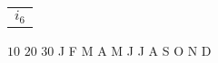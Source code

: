\documentclass{book}
\begin{document}
\stopmpxshipout
\mpxshipout%
{\small \renewcommand{\arraystretch}{.9}
              \circuitfont\begin{tabular}{@{}l@{}}
                  $i_6$ 
              \end{tabular}}%
\stopmpxshipout
\mpxshipout%
\small $10$%
\stopmpxshipout
\mpxshipout%
\small $20$%
\stopmpxshipout
\mpxshipout%
\small $30$%
\stopmpxshipout
\mpxshipout%
\small J%
\stopmpxshipout
\mpxshipout%
\small F%
\stopmpxshipout
\mpxshipout%
\small M%
\stopmpxshipout
\mpxshipout%
\small A%
\stopmpxshipout
\mpxshipout%
\small M%
\stopmpxshipout
\mpxshipout%
\small J%
\stopmpxshipout
\mpxshipout%
\small J%
\stopmpxshipout
\mpxshipout%
\small A%
\stopmpxshipout
\mpxshipout%
\small S%
\stopmpxshipout
\mpxshipout%
\small O%
\stopmpxshipout
\mpxshipout%
\small N%
\stopmpxshipout
\mpxshipout%
\small D%
\stopmpxshipout
\end{document}

